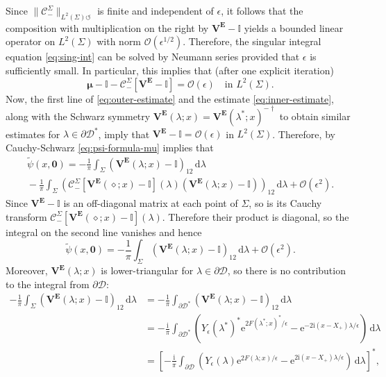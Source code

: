 \documentclass[12pt]{amsart}
\numberwithin{equation}{section}
\newcommand{\dd}{\mathrm{d}}
\newcommand{\ee}{\mathrm{e}}
\newcommand{\ii}{\mathrm{i}}
\newcommand{\SP}{\lambda}
\newcommand{\eps}{\epsilon}
\newcommand{\bigo}[1]{ \mathcal{O}\! \left( #1 \right) }
\begin{document}
Since $\|\mathcal{C}_-^\Sigma\|_{L^2(\Sigma)\circlearrowleft}$ is finite and independent of $\epsilon$, it follows that the composition with multiplication on the right by $\mathbf{V}^\mathbf{E}-\mathbb{I}$ yields a bounded linear operator on $L^2(\Sigma)$ with norm $\bigo{\epsilon^{1/2}}$.  Therefore, the singular integral equation \eqref{eq:sing-int} can be solved by Neumann series provided that $\epsilon$ is sufficiently small.  In particular, this implies that (after one explicit iteration)
\begin{equation}
\boldsymbol{\mu}-\mathbb{I}-\mathcal{C}_-^\Sigma[\mathbf{V}^\mathbf{E}-\mathbb{I}] = \bigo{\epsilon}\quad\text{in $L^2(\Sigma)$}.
\end{equation}
Now, the first line of \eqref{eq:outer-estimate} and the estimate \eqref{eq:inner-estimate}, along with the Schwarz symmetry $\mathbf{V}^\mathbf{E}(\lambda;x)=\mathbf{V}^\mathbf{E}(\lambda^*;x)^{-\dagger}$ to obtain similar estimates for $\lambda\in\partial \mathscr{D}^*$, imply that $\mathbf{V}^\mathbf{E}-\mathbb{I}=\bigo{\epsilon}$ in $L^2(\Sigma)$.  Therefore,
by Cauchy-Schwarz \eqref{eq:psi-formula-mu} implies that
\begin{multline}
\widetilde{\psi}(x,\mathbf{0})=-\frac{1}{\pi}\int_\Sigma (\mathbf{V}^\mathbf{E}(\SP;x)-\mathbb{I})_{12}\,\dd\SP \\{}- 
\frac{1}{\pi}\int_\Sigma\left(\mathcal{C}_-^\Sigma[\mathbf{V}^\mathbf{E}(\diamond;x)-\mathbb{I}](\SP)(\mathbf{V}^\mathbf{E}(\SP;x)-\mathbb{I})\right)_{12}\,\dd\SP+
\bigo{\epsilon^2}.
\end{multline}
Since $\mathbf{V}^\mathbf{E}-\mathbb{I}$ is an off-diagonal matrix at each point of $\Sigma$, so is its Cauchy transform $\mathcal{C}_-^\Sigma[\mathbf{V}^\mathbf{E}(\diamond;x)-\mathbb{I}](\SP)$.  Therefore their product is diagonal, so the integral on the second line vanishes and hence
\begin{equation}
\widetilde{\psi}(x,\mathbf{0})=-\frac{1}{\pi}\int_\Sigma (\mathbf{V}^\mathbf{E}(\SP;x)-\mathbb{I})_{12}\,\dd\SP+
\bigo{\epsilon^2}.
\label{eq:psi-leading-term}
\end{equation}
Moreover, $\mathbf{V}^\mathbf{E}(\lambda;x)$ is lower-triangular for $\lambda\in\partial\mathscr{D}$, so there is no contribution to the integral from $\partial \mathscr{D}$:
\begin{equation}
\begin{split}
-\frac{1}{\pi}\int_\Sigma (\mathbf{V}^\mathbf{E}(\SP;x)-\mathbb{I})_{12}\,\dd\SP &=-\frac{1}{\pi}\int_{\partial \mathscr{D}^*}(\mathbf{V}^\mathbf{E}(\SP;x)-\mathbb{I})_{12}\,\dd\SP\\
&=-\frac{\ii}{\pi}\int_{\partial \mathscr{D}^*} \left(Y_\epsilon(\SP^*)^*\ee^{2F(\SP^*;x)^*/\epsilon}-\ee^{-2\ii (x-X_+)\SP/\epsilon}\right)\,\dd\SP\\
&=\left[-\frac{\ii}{\pi}\int_{\partial\mathscr{D}}\left(Y_\epsilon(\SP)\ee^{2F(\SP;x)/\eps}-\ee^{2\ii (x-X_+)\SP/\eps}\right)\,\dd\SP\right]^*,
\end{split}
\label{eq:integral-VminusI-12}
\end{equation}
\end{document}
